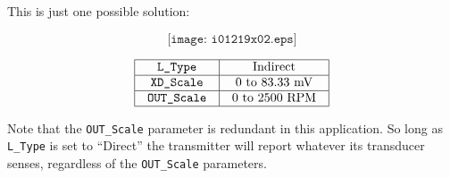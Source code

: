 
This is just one possible solution:

$$\texttt{[image: i01219x02.eps]}$$


$$\vbox{\offinterlineskip
\halign{\strut
\vrule \quad\hfil # \ \hfil & 
\vrule \quad\hfil # \ \hfil \vrule \cr
\noalign{\hrule}
%
{\tt L\_Type} & Indirect \cr
%
\noalign{\hrule}
%
{\tt XD\_Scale} & 0 to 83.33 mV \cr
%
\noalign{\hrule}
%
{\tt OUT\_Scale} & 0 to 2500 RPM \cr
%
\noalign{\hrule}
} %
}$$ %

\vskip 10pt

Note that the {\tt OUT\_Scale} parameter is redundant in this application.  So long as {\tt L\_Type} is set to ``Direct'' the transmitter will report whatever its transducer senses, regardless of the {\tt OUT\_Scale} parameters.




